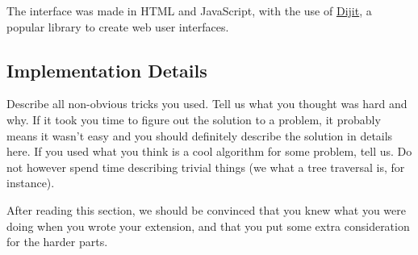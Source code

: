 The interface was made in HTML and JavaScript, with the use of \href{http://dojotoolkit.org/reference-guide/1.10/dijit/}{Dijit}, a popular library to create web user interfaces.

\subsection{Implementation Details}
Describe all non-obvious tricks you used. Tell us what you thought was hard and
why. If it took you time to figure out the solution to a problem, it probably
means it wasn't easy and you should definitely describe the solution in details
here. If you used what you think is a cool algorithm for some problem, tell us.
Do not however spend time describing trivial things (we what a tree traversal
is, for instance). 

After reading this section, we should be convinced that you knew what you were
doing when you wrote your extension, and that you put some extra consideration
for the harder parts.
